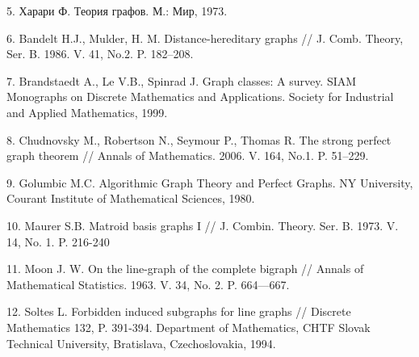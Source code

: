 \documentclass[12pt]{article}
\begin{document}
5. Харари Ф. Теория графов. М.: Мир, 1973.

6. Bandelt H.J., Mulder, H. M. Distance-hereditary graphs // J. Comb. Theory, Ser. B. 1986. V. 41, No.2. P. 182–208.

7. Brandstaedt A., Le V.B., Spinrad J. Graph classes: A survey. SIAM Monographs on Discrete Mathematics and Applications. Society for Industrial and Applied Mathematics, 1999.

8. Chudnovsky M., Robertson N., Seymour P., Thomas R. The strong perfect graph theorem // Annals of Mathematics. 2006. V. 164, No.1. P. 51–229.

9. Golumbic M.C. Algorithmic Graph Theory and Perfect Graphs. NY University, Courant Institute of Mathematical Sciences, 1980.

10. Maurer S.B. Matroid basis graphs I // J. Combin. Theory. Ser. B. 1973. V. 14, No. 1. P. 216-240

11. Moon J. W. On the line-graph of the complete bigraph // Annals of Mathematical Statistics. 1963. V. 34, No. 2. P. 664—667.

12. Soltes L. Forbidden induced subgraphs for line graphs // Discrete Mathematics 132, P. 391-394. Department of Mathematics, CHTF Slovak Technical University, Bratislava, Czechoslovakia, 1994.
\end{document}
